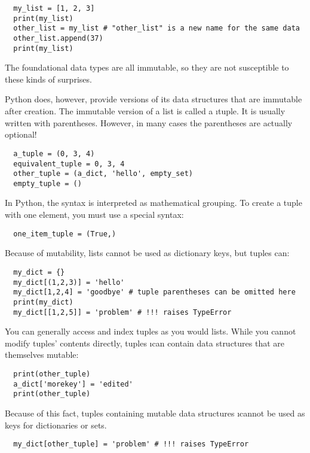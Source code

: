 \documentclass[letterpaper, 12pt, titlepage, twoside]{article}
\begin{document}
\begin{lstlisting}
  my_list = [1, 2, 3]
  print(my_list)
  other_list = my_list # "other_list" is a new name for the same data
  other_list.append(37)
  print(my_list)
\end{lstlisting}

The foundational data types are all immutable, so they are not susceptible to
these kinds of surprises.

Python does, however, provide versions of its data structures that are
immutable after creation. The immutable version of a list is called a
\i{tuple}. It is usually written with parentheses. However, in many cases the
parentheses are actually optional!

\begin{lstlisting}
  a_tuple = (0, 3, 4)
  equivalent_tuple = 0, 3, 4
  other_tuple = (a_dict, 'hello', empty_set)
  empty_tuple = ()
\end{lstlisting}

In Python, the syntax  is interpreted as mathematical grouping. To
create a tuple with one element, you must use a special syntax:

\begin{lstlisting}
  one_item_tuple = (True,)
\end{lstlisting}

Because of mutability, lists cannot be used as dictionary keys, but tuples can:

\begin{lstlisting}
  my_dict = {}
  my_dict[(1,2,3)] = 'hello'
  my_dict[1,2,4] = 'goodbye' # tuple parentheses can be omitted here
  print(my_dict)
  my_dict[[1,2,5]] = 'problem' # !!! raises TypeError
\end{lstlisting}

You can generally access and index tuples as you would lists. While you cannot
modify tuples' contents directly, tuples \i{can} contain data structures that
are themselves mutable:

\begin{lstlisting}
  print(other_tuple)
  a_dict['morekey'] = 'edited'
  print(other_tuple)
\end{lstlisting}

Because of this fact, tuples containing mutable data structures
\i{cannot} be used as keys for dictionaries or sets.

\begin{lstlisting}
  my_dict[other_tuple] = 'problem' # !!! raises TypeError
\end{lstlisting}
\end{document}
